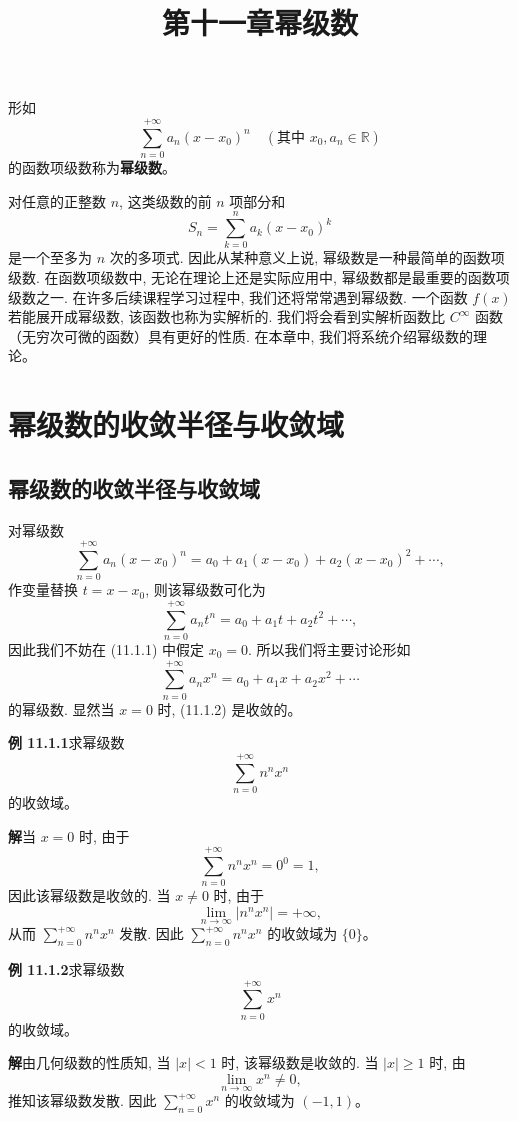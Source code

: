 \documentclass[UTF8,12pt,a4paper,fontset=fandol]{ctexart}
\title{第十一章\quad 幂级数}
\author{}
\date{}
\begin{document}
\maketitle

形如
\[
  \sum_{n=0}^{+\infty}a_n(x-x_0)^n
  \quad(\text{其中 }x_0,a_n\in\mathbb R)
\]
的函数项级数称为\textbf{幂级数}。

对任意的正整数 $n$, 这类级数的前 $n$ 项部分和
\[
  S_n=\sum_{k=0}^{n}a_k(x-x_0)^k
\]
是一个至多为 $n$ 次的多项式. 因此从某种意义上说, 幂级数是一种最简单的函数项级数. 在函数项级数中, 无论在理论上还是实际应用中, 幂级数都是最重要的函数项级数之一. 在许多后续课程学习过程中, 我们还将常常遇到幂级数. 一个函数 $f(x)$ 若能展开成幂级数, 该函数也称为实解析的. 我们将会看到实解析函数比 $C^\infty$ 函数（无穷次可微的函数）具有更好的性质. 在本章中, 我们将系统介绍幂级数的理论。

\section{幂级数的收敛半径与收敛域}

\subsection{幂级数的收敛半径与收敛域}

对幂级数
\begin{equation}
  \sum_{n=0}^{+\infty}a_n(x-x_0)^n
  =a_0+a_1(x-x_0)+a_2(x-x_0)^2+\cdots ,
  \tag{11.1.1}
\end{equation}
作变量替换 $t=x-x_0$, 则该幂级数可化为
\[
  \sum_{n=0}^{+\infty}a_nt^n=a_0+a_1t+a_2t^2+\cdots ,
\]
因此我们不妨在 (11.1.1) 中假定 $x_0=0$. 所以我们将主要讨论形如
\begin{equation}
  \sum_{n=0}^{+\infty}a_nx^n=a_0+a_1x+a_2x^2+\cdots
  \tag{11.1.2}
\end{equation}
的幂级数. 显然当 $x=0$ 时, (11.1.2) 是收敛的。

\noindent\textbf{例 11.1.1}\quad 求幂级数
\[
  \sum_{n=0}^{+\infty}n^nx^n
\]
的收敛域。

\noindent\textbf{解}\quad 当 $x=0$ 时, 由于
\[
  \sum_{n=0}^{+\infty}n^nx^n=0^0=1,
\]
因此该幂级数是收敛的. 当 $x\ne0$ 时, 由于
\[
  \lim_{n\to\infty}|n^nx^n|=+\infty,
\]
从而 $\sum_{n=0}^{+\infty}n^nx^n$ 发散. 因此 $\sum_{n=0}^{+\infty}n^nx^n$ 的收敛域为 $\{0\}$。

\noindent\textbf{例 11.1.2}\quad 求幂级数
\[
  \sum_{n=0}^{+\infty}x^n
\]
的收敛域。

\noindent\textbf{解}\quad 由几何级数的性质知, 当 $|x|<1$ 时, 该幂级数是收敛的. 当 $|x|\geqslant1$ 时, 由
\[
  \lim_{n\to\infty}x^n\ne0,
\]
推知该幂级数发散. 因此 $\sum_{n=0}^{+\infty}x^n$ 的收敛域为 $(-1,1)$。
\end{document}
